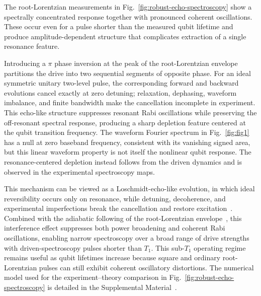\par
The root-Lorentzian measurements in Fig.~\ref{fig:robust-echo-spectroscopy}
show a spectrally concentrated response together with pronounced coherent
oscillations. These occur even for a pulse shorter than the measured
qubit lifetime and produce amplitude-dependent structure that complicates
extraction of a single resonance feature.

Introducing a $\pi$ phase inversion at the peak of the root-Lorentzian envelope partitions the drive into two sequential segments of opposite phase.  For an ideal symmetric unitary two-level pulse, the corresponding forward and backward evolutions cancel exactly at zero detuning; relaxation, dephasing, waveform imbalance, and finite bandwidth make the cancellation incomplete in experiment.  This echo-like structure suppresses resonant Rabi oscillations while preserving the off-resonant spectral response, producing a sharp depletion feature centered at the qubit transition frequency.  The waveform Fourier spectrum in Fig.~\ref{fig:fig1} has a null at zero baseband frequency, consistent with its vanishing signed area, but this linear waveform property is not itself the nonlinear qubit response.  The resonance-centered depletion instead follows from the driven dynamics and is observed in the experimental spectroscopy maps.

This mechanism can be viewed as a Loschmidt-echo-like evolution, in which ideal reversibility occurs only on resonance, while detuning, decoherence, and experimental imperfections break the cancellation and restore excitation~\cite{Gorin_2006,PhysRevA.30.1610}. Combined with the adiabatic following of the root-Lorentzian envelope~\cite{boradjiev_power_2013,mihov_defying_2024}, this interference effect suppresses both power broadening and coherent Rabi oscillations, enabling narrow spectroscopy over a broad range of drive strengths with driven-spectroscopy pulses shorter than $T_1$. This sub-$T_1$ operating regime remains useful as qubit lifetimes increase because square and ordinary root-Lorentzian pulses can still exhibit coherent oscillatory distortions. The numerical model used for the experiment--theory comparison in Fig.~\ref{fig:robust-echo-spectroscopy} is detailed in the Supplemental Material~\cite{SupplementalMaterial}.




